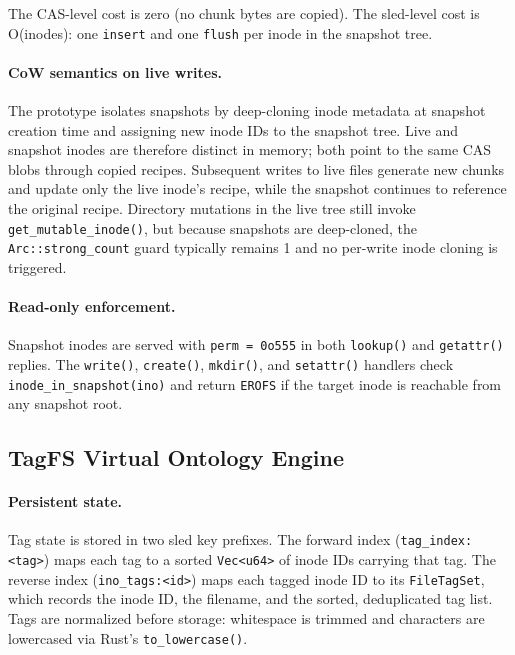 \documentclass[5p,times]{elsarticle}
\begin{document}
The CAS-level cost is zero (no chunk bytes are copied).  The
sled-level cost is O(inodes): one \texttt{insert} and one \texttt{flush}
per inode in the snapshot tree.

\paragraph{CoW semantics on live writes.}
The prototype isolates snapshots by deep-cloning inode metadata at
snapshot creation time and assigning new inode IDs to the snapshot tree.
Live and snapshot inodes are therefore distinct in memory; both point to
the same CAS blobs through copied recipes.  Subsequent writes to live
files generate new chunks and update only the live inode's recipe, while
the snapshot continues to reference the original recipe.  Directory
mutations in the live tree still invoke \texttt{get\_mutable\_inode()},
but because snapshots are deep-cloned, the \texttt{Arc::strong\_count}
guard typically remains 1 and no per-write inode cloning is triggered.

\paragraph{Read-only enforcement.}
Snapshot inodes are served with \texttt{perm = 0o555} in both
\texttt{lookup()} and \texttt{getattr()} replies.  The \texttt{write()},
\texttt{create()}, \texttt{mkdir()}, and \texttt{setattr()} handlers
check \texttt{inode\_in\_snapshot(ino)} and return \texttt{EROFS}
if the target inode is reachable from any snapshot root.

\subsection{TagFS Virtual Ontology Engine}
\label{sec:tagfs}

\paragraph{Persistent state.}
Tag state is stored in two sled key prefixes.  The forward index
(\texttt{tag\_index:\textless{}tag\textgreater{}}) maps each tag to a
sorted \texttt{Vec\textless{}u64\textgreater{}} of inode IDs carrying
that tag.  The reverse index (\texttt{ino\_tags:\textless{}id\textgreater{}})
maps each tagged inode ID to its \texttt{FileTagSet}, which records the
inode ID, the filename, and the sorted, deduplicated tag list.  Tags are
normalized before storage: whitespace is trimmed and characters are
lowercased via Rust's \texttt{to\_lowercase()}.
\end{document}
